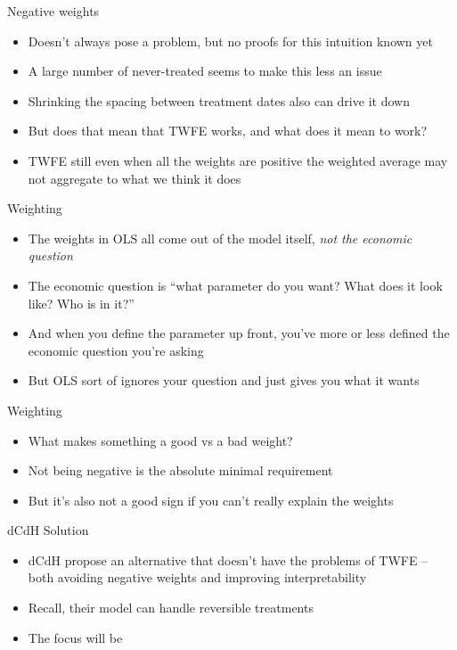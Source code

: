 \documentclass{beamer}
\begin{document}
\begin{frame}{Negative weights}

\begin{itemize}
\item Doesn't always pose a problem, but no proofs for this intuition known yet
\item A large number of never-treated seems to make this less an issue
\item Shrinking the spacing between treatment dates also can drive it down
\item But does that mean that TWFE works, and what does it mean to work?
\item TWFE still even when all the weights are positive the weighted average may not aggregate to what we think it does
\end{itemize}

\end{frame}

\begin{frame}{Weighting}

\begin{itemize}
\item The weights in OLS all come out of the model itself, \emph{not the economic question}
\item The economic question is ``what parameter do you want? What does it look like? Who is in it?''
\item And when you define the parameter up front, you've more or less defined the economic question you're asking
\item But OLS sort of ignores your question and just gives you what it wants
\end{itemize}

\end{frame}

\begin{frame}{Weighting}

\begin{itemize}
\item What makes something a good vs a bad weight?
\item Not being negative is the absolute minimal requirement
\item But it's also not a good sign if you can't really explain the weights
\end{itemize}

\end{frame}

\begin{frame}{dCdH Solution}

\begin{itemize}
\item dCdH propose an alternative that doesn't have the problems of TWFE -- both avoiding negative weights and improving interpretability
\item Recall, their model can handle reversible treatments
\item The focus will be 

\end{itemize}

\end{frame}
\end{document}
